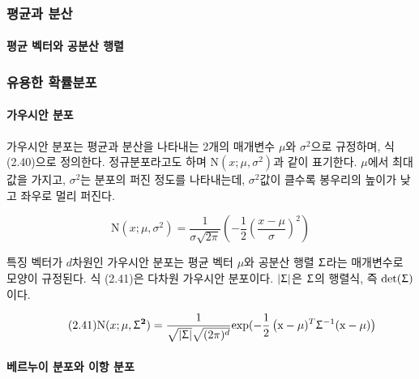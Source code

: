 \documentclass [12pt] {oblivoir}
\let\oldsubsubsection=\subsubsection
\renewcommand{\subsubsection}
{
  \filbreak
  \oldsubsubsection
}
\begin{document}
\subsubsection{평균과 분산}

\paragraph*{평균 벡터와 공분산 행렬}\mbox{}

\subsubsection{유용한 확률분포}

\paragraph*{가우시안 분포}\mbox{}

\vspace{3mm}
\;가우시안 분포는 평균과 분산을 나타내는 2개의 매개변수 $\mu$와 $\sigma^{2}$으로 규정하며,
식 (2.40)으로 정의한다. 정규분포라고도 하며 $\text{N}(x; \mu, \sigma^{2})$과 같이 표기한다. $\mu$에서 최대값을 가지고, $\sigma^{2}$는 분포의 퍼진 정도를 나타내는데,
$\sigma^{2}$값이 클수록 봉우리의 높이가 낮고 좌우로 멀리 퍼진다.

\begin{equation} \tag{2.40}
  \text{N}(x; \mu, \sigma^{2}) = \frac{1}{\sigma\sqrt{2\pi}}\left(-\frac{1}{2}\left(\frac{x - \mu}{\sigma}\right)^{2}\right)
\end{equation}

\vspace{3mm}
\;특징 벡터가 $d$차원인 가우시안 분포는 평균 벡터 $\mu$와 공분산 행렬 $\mathbf{\Upsigma}$라는 매개변수로 모양이 규정된다. 식 (2.41)은 다차원 가우시안 분포이다.
$|\mathbf{\Upsigma}|$은 $\mathbf{\Upsigma}$의 행렬식, 즉 $\text{det}(\mathbf{\Upsigma})$이다.

\begin{equation} \tag{2.41}
  \text{N}(x; \mu, \mathbf{\Upsigma^{2}}) = \frac{1}{\sqrt{|\mathbf{\Upsigma}|}\sqrt{(2\pi)^{d}}}\text{exp}(-\frac{1}{2}\left(\mathbf{\text{x}} - \mathbf{\mu})^{T}\mathbf{\Upsigma}^{-1}(\mathbf{\text{x} - \mu})\right)
\end{equation}

\paragraph*{베르누이 분포와 이항 분포}\mbox{}
\end{document}
